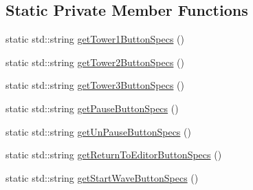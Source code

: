 \subsection*{Static Private Member Functions}
\begin{DoxyCompactItemize}
\item 
static std\+::string \hyperlink{class_game_state_play_a11c1d1976d85631c84a8db18b1458637}{get\+Tower1\+Button\+Specs} ()
\item 
static std\+::string \hyperlink{class_game_state_play_a0b9e886dc6a80b52f559441c7a3455d8}{get\+Tower2\+Button\+Specs} ()
\item 
static std\+::string \hyperlink{class_game_state_play_a0c79cb57b169ec8c0dc08c49451ebfc1}{get\+Tower3\+Button\+Specs} ()
\item 
static std\+::string \hyperlink{class_game_state_play_a84292b8af5919f8da3b54c1d1dba5cfd}{get\+Pause\+Button\+Specs} ()
\item 
static std\+::string \hyperlink{class_game_state_play_a93771d14333ebc475f2428d3c1a3c3d3}{get\+Un\+Pause\+Button\+Specs} ()
\item 
static std\+::string \hyperlink{class_game_state_play_aed4df6e7af126ba32ac06eb5dd79694d}{get\+Return\+To\+Editor\+Button\+Specs} ()
\item 
static std\+::string \hyperlink{class_game_state_play_ace72b0eb76edd4a7e02ab12454f9f5b7}{get\+Start\+Wave\+Button\+Specs} ()
\end{DoxyCompactItemize}
